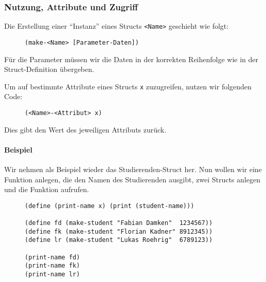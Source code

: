 	\subsubsection{Nutzung, Attribute und Zugriff}
		Die Erstellung einer \enquote{Instanz} eines Structs \texttt{<Name>} geschieht wie folgt:
		\begin{figure}[H]
			\centering
			\begin{lstlisting}[language = Racket]
(make-<Name> [Parameter-Daten])
\end{lstlisting}
		\end{figure}
		Für die Parameter müssen wir die Daten in der korrekten Reihenfolge wie in der Struct-Definition übergeben.
		
		Um auf bestimmte Attribute eines Structs \texttt{x} zuzugreifen, nutzen wir folgenden Code:
		\begin{figure}[H]
			\centering
			\begin{lstlisting}[language = Racket]
(<Name>-<Attribut> x)
\end{lstlisting}
		\end{figure}
		Dies gibt den Wert des jeweiligen Attributs zurück.
		
		\paragraph{Beispiel}
			Wir nehmen als Beispiel wieder das Studierenden-Struct her. Nun wollen wir eine Funktion anlegen, die den Namen des Studierenden ausgibt, zwei Structs anlegen und die Funktion aufrufen.
			
			\begin{figure}[H]
				\centering
				\begin{lstlisting}[language = Racket]
(define (print-name x) (print (student-name)))

(define fd (make-student "Fabian Damken"  1234567))
(define fk (make-student "Florian Kadner" 8912345))
(define lr (make-student "Lukas Roehrig"  6789123))

(print-name fd)
(print-name fk)
(print-name lr)
\end{lstlisting}
			\end{figure}
